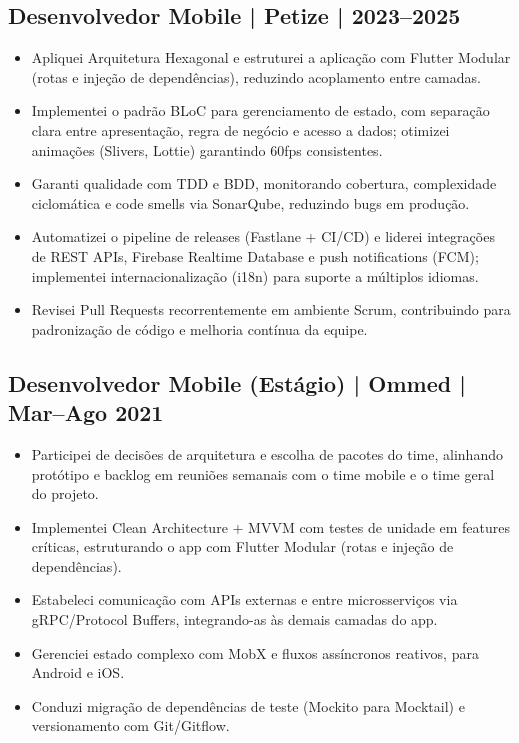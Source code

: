 \documentclass[11pt,a4paper]{article}
\begin{document}
\subsection*{Desenvolvedor Mobile | Petize | 2023–2025}

\begin{itemize}[leftmargin=*, itemsep=1pt]
    \item Apliquei Arquitetura Hexagonal e estruturei a aplicação com Flutter Modular (rotas e injeção de dependências), reduzindo acoplamento entre camadas.
    \item Implementei o padrão BLoC para gerenciamento de estado, com separação clara entre apresentação, regra de negócio e acesso a dados; otimizei animações (Slivers, Lottie) garantindo 60fps consistentes.
    \item Garanti qualidade com TDD e BDD, monitorando cobertura, complexidade ciclomática e code smells via SonarQube, reduzindo bugs em produção.
    \item Automatizei o pipeline de releases (Fastlane + CI/CD) e liderei integrações de REST APIs, Firebase Realtime Database e push notifications (FCM); implementei internacionalização (i18n) para suporte a múltiplos idiomas.
    \item Revisei Pull Requests recorrentemente em ambiente Scrum, contribuindo para padronização de código e melhoria contínua da equipe.
\end{itemize}

\subsection*{Desenvolvedor Mobile (Estágio) | Ommed | Mar–Ago 2021}

\begin{itemize}[leftmargin=*, itemsep=1pt]
    \item Participei de decisões de arquitetura e escolha de pacotes do time, alinhando protótipo e backlog em reuniões semanais com o time mobile e o time geral do projeto.
    \item Implementei Clean Architecture + MVVM com testes de unidade em features críticas, estruturando o app com Flutter Modular (rotas e injeção de dependências).
    \item Estabeleci comunicação com APIs externas e entre microsserviços via gRPC/Protocol Buffers, integrando-as às demais camadas do app.
    \item Gerenciei estado complexo com MobX e fluxos assíncronos reativos, para Android e iOS.
    \item Conduzi migração de dependências de teste (Mockito para Mocktail) e versionamento com Git/Gitflow.
\end{itemize}
\end{document}

